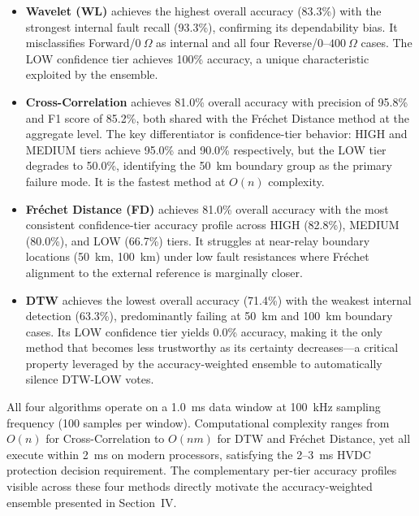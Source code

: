\documentclass[journal]{IEEEtran}
\begin{document}
\begin{itemize}
\item \textbf{Wavelet (WL)} achieves the highest overall accuracy
(83.3\%) with the strongest internal fault recall (93.3\%), confirming
its dependability bias. It misclassifies Forward/$0~\Omega$ as internal
and all four Reverse/$0$--$400~\Omega$ cases. The LOW confidence tier
achieves 100\% accuracy, a unique characteristic exploited by the
ensemble.

\item \textbf{Cross-Correlation} achieves 81.0\% overall accuracy with
precision of 95.8\% and F1 score of 85.2\%, both shared with the
Fr\'{e}chet Distance method at the aggregate level. The key
differentiator is confidence-tier behavior: HIGH and MEDIUM tiers
achieve 95.0\% and 90.0\% respectively, but the LOW tier degrades to
50.0\%, identifying the 50~km boundary group as the primary failure
mode. It is the fastest method at $O(n)$ complexity.

\item \textbf{Fr\'{e}chet Distance (FD)} achieves 81.0\% overall
accuracy with the most consistent confidence-tier accuracy profile
across HIGH (82.8\%), MEDIUM (80.0\%), and LOW (66.7\%) tiers.
It struggles at near-relay boundary locations (50~km, 100~km) under
low fault resistances where Fréchet alignment to the external reference
is marginally closer.

\item \textbf{DTW} achieves the lowest overall accuracy (71.4\%) with
the weakest internal detection (63.3\%), predominantly failing at
50~km and 100~km boundary cases. Its LOW confidence tier yields 0.0\%
accuracy, making it the only method that becomes less trustworthy
as its certainty decreases---a critical property leveraged by the
accuracy-weighted ensemble to automatically silence DTW-LOW votes.
\end{itemize}

All four algorithms operate on a 1.0~ms data window at 100~kHz
sampling frequency (100 samples per window). Computational complexity
ranges from $O(n)$ for Cross-Correlation to $O(nm)$ for DTW and
Fr\'{e}chet Distance, yet all execute within 2~ms on modern processors,
satisfying the 2--3~ms HVDC protection decision requirement. The
complementary per-tier accuracy profiles visible across these four
methods directly motivate the accuracy-weighted ensemble presented
in Section~IV.

\end{document}
